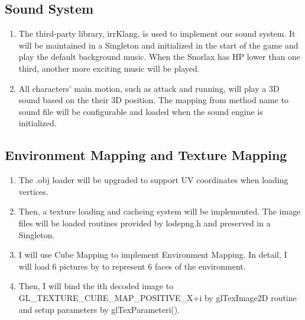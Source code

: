\documentclass {article}
\begin{document}
     \subsection{Sound System}
     \begin{enumerate}
        \item The third-party library, irrKlang, is used to implement our sound system. It will be maintained in a Singleton and initialized in the start of the game and play
        the default background music. When the Snorlax has HP lower than one third, another more exciting music will be played.
        \item All characters' main motion, such as attack and running, will play a 3D sound based on the their 3D position. The mapping from method name to sound file will be configurable
        and loaded when the sound engine is initialized.
     \end{enumerate}
     \subsection{Environment Mapping and Texture Mapping}
     \begin{enumerate}
        \item The .obj loader will be upgraded to support UV coordinates when loading vertices.
        \item Then, a texture loading and cacheing system will be implemented. The image files will be 
        loaded routines provided by lodepng.h and preserved in a Singleton.
        \item I will use Cube Mapping to implement Environment Mapping. In detail, I will load 6 pictures by to 
        represent 6 faces of the environment.
        \item Then, I will bind the ith decoded image to GL\_TEXTURE\_CUBE\_MAP\_POSITIVE\_X+i by glTexImage2D routine and setup parameters by glTexParameteri().
     \end{enumerate}
\end{document}
